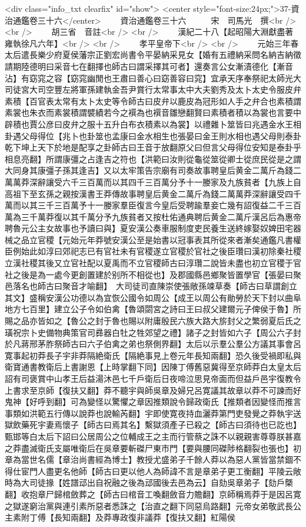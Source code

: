 <div class="info_txt clearfix" id="show">
<center style="font-size:24px;">37-資治通鑑卷三十六</center>
  　　資治通鑑卷三十六　　　宋　司馬光　撰<br />
<br />
　　胡三省　音註<br />
<br />
　　漢紀二十八【起昭陽大淵獻盡著雍執徐凡六年】<br />
<br />
　　孝平皇帝下<br />
<br />
　　元始三年春太后遣長樂少府夏侯藩宗正劉宏尚書令平晏納采見女【婚有五禮納采問名納吉納徵請期陸德明曰采音七在翻擇也師古曰謂采擇其可者】還奏言公女漸漬德化【漸音沾】有窈窕之容【窈窕幽閒也王肅曰善心曰窈善容曰窕】宜承天序奉祭祀太師光大司徒宮大司空豐左將軍孫建執金吾尹賞行太常事太中大夫劉秀及太卜太史令服皮弁素積【百官表太常有太卜太史等令師古曰皮弁以鹿皮為冠形如人手之弁合也素積謂素裳也朱衣而素裳積謂襞績若今之襈為也襈音雛戀翻賢曰素積者積以為裳也言要中辟積也賈公彦曰皮弁之服十五升白布衣積素以為裳】以禮雜卜筮皆曰兆遇金水王相卦遇父母得位【兆卜也卦筮也孟康曰金水相生也張晏曰金王則水相也遇父母則泰卦乾下坤上天下於地是配享之卦師古曰王音于放翻原父曰但言父母得位安知是泰卦乎相息亮翻】所謂康彊之占逢吉之符也【洪範曰汝則從龜從筮從卿士從庶民從是之謂大同身其康彊子孫其逢吉】又以太牢策告宗廟有司奏故事聘皇后黄金二萬斤為錢二萬萬莽深辭讓受六千三百萬而以其四千三百萬分予十一媵家及九族貧者【九族上自高祖下至玄孫之親按漢書王莽傳故事聘皇后黄金二萬斤為錢二萬萬莽深辭讓受四千萬而以其三千三百萬予十一媵家羣臣復言今皇后受聘踰羣妾亡幾有詔復益二千三百萬為三千萬莽復以其千萬分予九族貧者又按杜佑通典聘后黄金二萬斤漢呂后為惠帝聘魯元公主女故事也予讀曰與】夏安漢公奏車服制度吏民養生送終嫁娶奴婢田宅器械之品立官稷【元始元年莽號安漢公至是始書以冠事表其所從來者漸矣通鑑凡書權臣例始此如淳曰郊祀志已有官社未有官稷遂立官稷於官社之後臣瓚曰漢初除秦社稷立漢社稷其後又立官社配以夏禹而不立官稷師古曰淳瓚二說皆未盡也初立官稷于官社之後是為一處今更創置建於别所不相從也】及郡國縣邑鄉聚皆置學官【張晏曰聚邑落名也師古曰聚音才喻翻】　大司徒司直陳崇使張敞孫竦草奏【師古曰草謂創立其文】盛稱安漢公功德以為宜恢公國令如周公【成王以周公有勛勞於天下封以曲阜地方七百里】建立公子令如伯禽【魯頌閟宮之詩曰王曰叔父建爾元子俾侯于魯】所賜之品亦皆如之【魯公之封于魯也賜以附庸殷民六族大路大旂封父之繁弱夏后氏之璜祝宗卜史備物典策官司彞器白牡之牲郊望之禮】諸子之封皆如六子【周公六子封於凡蔣邢茅胙祭師古曰六子伯禽之弟也祭側界翻】太后以示羣公羣公方議其事會呂寛事起初莽長子宇非莽隔絶衛氏【隔絶事見上卷元年長知兩翻】恐久後受禍即私與衛寶通書教衛后上書謝恩【上時掌翻下同】因陳丁傅舊惡冀得至京師莽白太皇太后詔有司褒賞中山孝王后益湯沐邑七千戶衛后日夜啼泣思見帝面而但益戶邑宇復教令上書求至京師【復扶又翻】莽不聽宇與師吳章及婦兄呂寛議其故章以莽不可諫而好鬼神【好呼到翻】可為變怪以驚懼之章因推類說令歸政衛氏【推類者因變怪而推言事類如洪範五行傳以說莽也說輸芮翻】宇即使寛夜持血灑莽第門吏發覺之莽執宇送獄飲藥死宇妻焉懷子【師古曰焉其名】繫獄須產子已殺之【師古曰須待也已訖也】甄邯等白太后下詔曰公居周公之位輔成王之主而行管蔡之誅不以親親害尊尊朕甚嘉之莽盡滅衛氏支屬唯衛后在吳章要斬磔尸東市門【要與腰同磔陟格翻裂也張也】初章為當世名儒【章治尚書經為博士】教授尤盛弟子千餘人莽以為惡人黨皆當禁錮不得仕宦門人盡更名他師【師古曰更以他人為師諱不言是章弟子更工衡翻】平陵云敞時為大司徒掾【姓譜䢵出自祝融之後為䢵國後去邑為云】自劾吳章弟子【劾戶槩翻】收抱章尸歸棺斂葬之【師古曰棺音工喚翻斂音力贍翻】京師稱焉莽于是因呂寛之獄遂窮治黨與連引素所惡者悉誅之【治直之翻下同惡烏路翻】元帝女弟敬武長公主素附丁傅【長知兩翻】及莽專政復非議莽【復扶又翻】紅陽侯